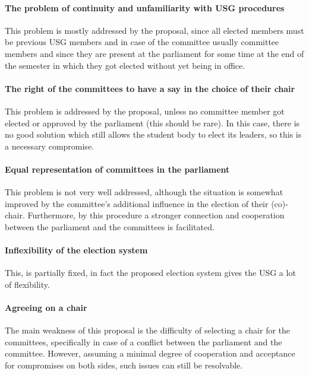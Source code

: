 \paragraph{The problem of continuity and unfamiliarity with USG procedures} This problem is mostly addressed by the proposal, since all elected members must be previous USG members and in case of the committee usually committee members and since they are present at the parliament for some time at the end of the semester in which they got elected without yet being in office. 

\paragraph{The right of the committees to have a say in the choice of their chair}
This problem is addressed by the proposal, unless no committee member got elected or approved by the parliament (this should be rare). In this case, there is no good solution which still allows the student body to elect its leaders, so this is a necessary compromise. 

\paragraph{Equal representation of committees in the parliament}
This problem is not very well addressed, although the situation is somewhat improved by the committee's additional influence in the election of their (co)-chair. Furthermore, by this procedure a stronger connection and cooperation between the parliament and the committees is facilitated. 

\paragraph{Inflexibility of the election system}
This, is partially fixed, in fact the proposed election system gives the USG a lot of flexibility. 

\paragraph{Agreeing on a chair} The main weakness of this proposal is the difficulty of selecting a chair for the committees, specifically in case of a conflict between the parliament and the committee. However, assuming a minimal degree of cooperation and acceptance for compromises on both sides, such issues can still be resolvable. 